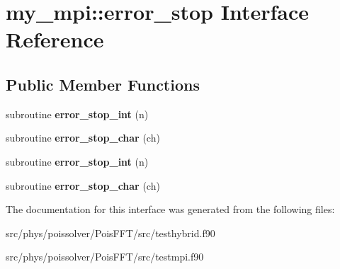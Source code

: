 \hypertarget{interfacemy__mpi_1_1error__stop}{}\section{my\+\_\+mpi\+:\+:error\+\_\+stop Interface Reference}
\label{interfacemy__mpi_1_1error__stop}
\subsection*{Public Member Functions}
\begin{DoxyCompactItemize}
\item 
subroutine {\bfseries error\+\_\+stop\+\_\+int} (n)\hypertarget{interfacemy__mpi_1_1error__stop_a8045d6ecd596ed6e5df6d53ef1ba39c6}{}\label{interfacemy__mpi_1_1error__stop_a8045d6ecd596ed6e5df6d53ef1ba39c6}

\item 
subroutine {\bfseries error\+\_\+stop\+\_\+char} (ch)\hypertarget{interfacemy__mpi_1_1error__stop_ae0cf656d7c9f0fbd32b350688da8b227}{}\label{interfacemy__mpi_1_1error__stop_ae0cf656d7c9f0fbd32b350688da8b227}

\item 
subroutine {\bfseries error\+\_\+stop\+\_\+int} (n)\hypertarget{interfacemy__mpi_1_1error__stop_a8045d6ecd596ed6e5df6d53ef1ba39c6}{}\label{interfacemy__mpi_1_1error__stop_a8045d6ecd596ed6e5df6d53ef1ba39c6}

\item 
subroutine {\bfseries error\+\_\+stop\+\_\+char} (ch)\hypertarget{interfacemy__mpi_1_1error__stop_ae0cf656d7c9f0fbd32b350688da8b227}{}\label{interfacemy__mpi_1_1error__stop_ae0cf656d7c9f0fbd32b350688da8b227}

\end{DoxyCompactItemize}


The documentation for this interface was generated from the following files\+:\begin{DoxyCompactItemize}
\item 
src/phys/poissolver/\+Pois\+F\+F\+T/src/testhybrid.\+f90\item 
src/phys/poissolver/\+Pois\+F\+F\+T/src/testmpi.\+f90\end{DoxyCompactItemize}
